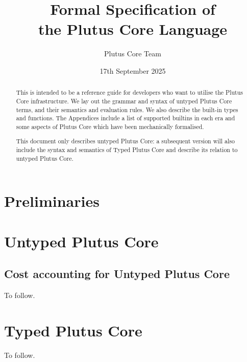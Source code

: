 \documentclass[a4paper]{report}
\title{Formal Specification of\\the Plutus Core Language\\
  \vspace{5mm}
  \LARGE{\red{\textsf{DRAFT}}}
}
\date{17th September 2025}
\author{Plutus Core Team}
\begin{document}
\maketitle

\begin{abstract}
  This is intended to be a reference guide for developers who want to utilise
  the Plutus Core infrastructure.  We lay out the grammar and syntax of untyped
  Plutus Core terms, and their semantics and evaluation rules.  We also describe
  the built-in types and functions.  The Appendices include a list of supported
  builtins in each era and some aspects of Plutus Core which have been
  mechanically formalised.

  This document only describes untyped Plutus Core: a subsequent version will also
  include the syntax and semantics of Typed Plutus Core and describe its relation to
  untyped Plutus Core.
\end{abstract}

\newpage
\tableofcontents
\newpage



\chapter{Preliminaries}


\chapter{Untyped Plutus Core}



\section{Cost accounting for Untyped Plutus Core}
To follow.
\chapter{Typed Plutus Core}
To follow.

\begin{appendices}



\end{appendices}

\newpage


\newpage
\printnomenclature[2cm]  %
\end{document}
